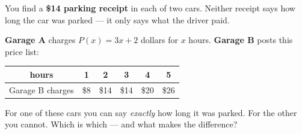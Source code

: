 \documentclass[10pt]{article}
\begin{document}
\boxguard[22]
\begin{hookbox}
You find a \textbf{\$14 parking receipt} in each of two cars. Neither receipt
says how long the car was parked --- it only says what the driver paid.

\smallskip
\textbf{Garage A} charges $P(x) = 3x + 2$ dollars for $x$ hours.
\textbf{Garage B} posts this price list:

\smallskip
\renewcommand{\arraystretch}{1.3}
\begin{center}
\begin{tabular}{|c|c|c|c|c|c|}
\hline
hours & 1 & 2 & 3 & 4 & 5 \\
\hline
Garage B charges & \$8 & \$14 & \$14 & \$20 & \$26 \\
\hline
\end{tabular}
\end{center}

\smallskip
For one of these cars you can say \textit{exactly} how long it was parked. For
the other you cannot. Which is which --- and what makes the difference?
\end{hookbox}

\vspace{0.1in}
\end{document}
